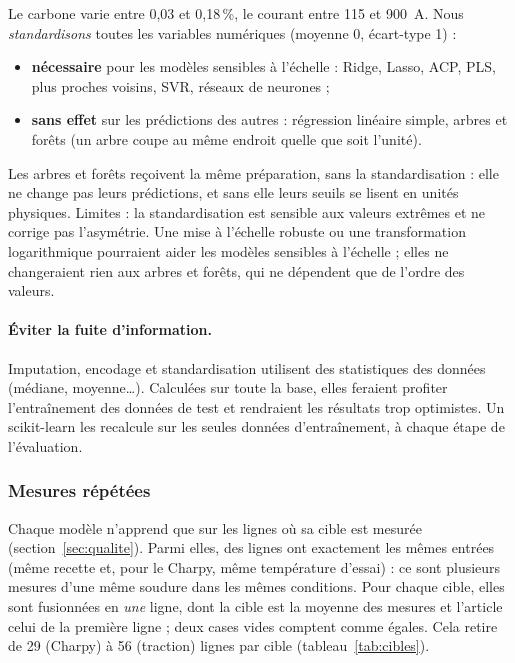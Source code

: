 Le carbone varie entre 0,03 et 0,18\,\%, le courant entre 115 et \SI{900}{\ampere}. Nous
\emph{standardisons} toutes les variables numériques (moyenne 0, écart-type 1) :
\begin{itemize}
  \item \textbf{nécessaire} pour les modèles sensibles à l'échelle : Ridge, Lasso, ACP,
    PLS, plus proches voisins, SVR, réseaux de neurones ;
  \item \textbf{sans effet} sur les prédictions des autres : régression linéaire simple,
    arbres et forêts (un arbre coupe au même endroit quelle que soit l'unité).
\end{itemize}
Les arbres et forêts reçoivent la même préparation, sans la standardisation : elle ne
change pas leurs prédictions, et sans elle leurs seuils se lisent en unités physiques.
Limites : la standardisation est sensible aux valeurs extrêmes et ne corrige pas
l'asymétrie. Une mise à l'échelle robuste ou une transformation logarithmique pourraient
aider les modèles sensibles à l'échelle ; elles ne changeraient rien aux arbres et forêts,
qui ne dépendent que de l'ordre des valeurs.

\paragraph{Éviter la fuite d'information.} Imputation, encodage et standardisation
utilisent des statistiques des données (médiane, moyenne\ldots). Calculées sur toute la
base, elles feraient profiter l'entraînement des données de test et rendraient les
résultats trop optimistes. Un  scikit-learn les recalcule sur les seules
données d'entraînement, à chaque étape de l'évaluation.


\subsubsection{Mesures répétées}\label{sec:prep-repetees}

Chaque modèle n'apprend que sur les lignes où sa cible est mesurée
(section~\ref{sec:qualite}). Parmi elles, des lignes ont exactement les mêmes entrées
(même recette et, pour le Charpy, même température d'essai) : ce sont plusieurs mesures
d'une même soudure dans les mêmes conditions. Pour chaque cible, elles sont fusionnées en
\emph{une} ligne, dont la cible est la moyenne des mesures et l'article celui de la
première ligne ; deux cases vides comptent comme égales. Cela retire de 29 (Charpy) à 56
(traction) lignes par cible (tableau~\ref{tab:cibles}).

